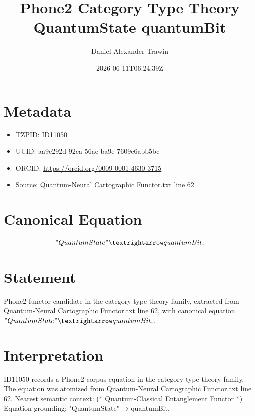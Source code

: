\documentclass[11pt]{article}
\title{Phone2 Category Type Theory QuantumState quantumBit}
\author{Daniel Alexander Trawin}
\date{2026-06-11T06:24:39Z}
\begin{document}
\maketitle
\section*{Metadata}
\begin{itemize}
\item TZPID: ID11050
\item UUID: aa9c292d-92ca-56ae-ba9e-7609e6abb5bc
\item ORCID: \url{https://orcid.org/0009-0001-4630-3715}
\item Source: Quantum-Neural Cartographic Functor.txt line 62
\end{itemize}
\section*{Canonical Equation}
\[
"QuantumState" → quantumBit,
\]
\section*{Statement}
Phone2 functor candidate in the category type theory family, extracted from Quantum-Neural Cartographic Functor.txt line 62, with canonical equation $"QuantumState" → quantumBit,$.
\section*{Interpretation}
ID11050 records a Phone2 corpus equation in the category type theory family. The equation was atomized from Quantum-Neural Cartographic Functor.txt line 62. Nearest semantic context: (* Quantum-Classical Entanglement Functor *) Equation grounding: "QuantumState" → quantumBit,
\end{document}
